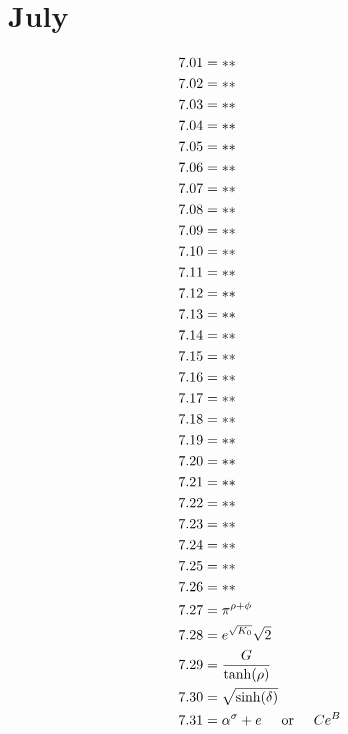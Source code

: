 \documentclass[12pt]{article}
\newcommand{\oder}{\hspace{5mm}\text{or}\hspace{5mm}}
\begin{document}
\section{July}
\begin{align*}
7.01 &= **\\
7.02 &= **\\
7.03 &= **\\
7.04 &= **\\
7.05 &= **\\
7.06 &= **\\
7.07 &= **\\
7.08 &= **\\
7.09 &= **\\
7.10 &= **\\
7.11 &= **\\
7.12 &= **\\
7.13 &= **\\
7.14 &= **\\
7.15 &= **\\
7.16 &= **\\
7.17 &= **\\
7.18 &= **\\
7.19 &= **\\
7.20 &= **\\
7.21 &= **\\
7.22 &= **\\
7.23 &= **\\
7.24 &= **\\
7.25 &= **\\
7.26 &= **\\
7.27 &= \pi^{\rho + \phi}\\
7.28 &= e^{\sqrt{K_{0}}}\sqrt{2}\\
7.29 &= \frac{G}{\tanh(\rho)}\\
7.30 &= \sqrt{\sinh(\delta)}\\
7.31 &= \alpha^{\sigma} + e \oder C e^{B}\\
\end{align*}

\pagebreak
 
\end{document}
